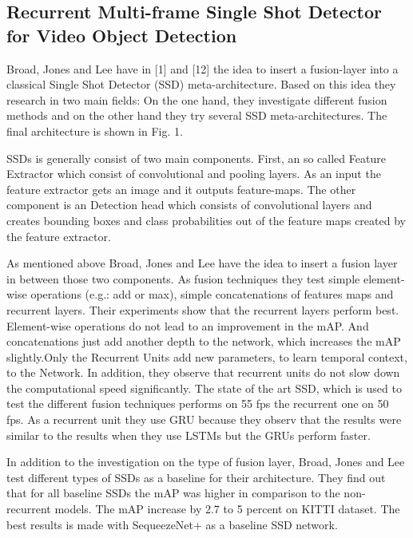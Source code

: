 \documentclass[conference]{IEEEtran}
\begin{document}
\subsection{Recurrent Multi-frame Single Shot Detector for Video Object Detection}
Broad, Jones and Lee have in [1] and [12] the idea to insert a fusion-layer into a classical Single Shot Detector (SSD) meta-architecture. Based on this idea they research in two main fields: On the one hand, they investigate different fusion methods and on the other hand they try several SSD meta-architectures. The final architecture is shown in Fig. 1. \newline

SSDs is generally consist of two main components. First, an so called Feature Extractor which consist of convolutional and pooling layers. As an input the feature extractor gets an image and it outputs feature-maps. The other component is an Detection head which consists of convolutional layers and creates bounding boxes and class probabilities out of the feature maps created by the feature extractor. \newline

As mentioned above Broad, Jones and Lee have the idea to insert a fusion layer in between those two components. As fusion techniques they test simple element-wise operations (e.g.: add or max), simple concatenations of features maps and recurrent layers. Their experiments show that the recurrent layers perform best. Element-wise operations do not lead to an improvement in the mAP. And concatenations just add another depth to the network, which increases the mAP slightly.Only the Recurrent Units add new parameters, to learn temporal context, to the Network. In addition, they observe that recurrent units do not slow down the computational speed significantly. The state of the art SSD, which is used to test the different fusion techniques performs on 55 fps the recurrent one on 50 fps. As a recurrent unit they use GRU because they observ that the results were similar to the results when they use LSTMs but the GRUs perform faster. \newline

In addition to the investigation on the type of fusion layer, Broad, Jones and Lee test different types of SSDs as a baseline for their architecture. They find out that for all baseline SSDs the mAP was higher in comparison to the non-recurrent models. The mAP increase by 2.7 to 5 percent on KITTI dataset. The best results is made with SequeezeNet+ as a baseline SSD network. \newline
\end{document}

